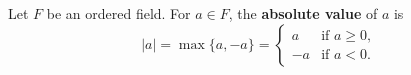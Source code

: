 Let \(F\) be an ordered field. For \(a \in F\), the \textbf{absolute value} of \(a\) is
\[
|a| = \max\{a, -a\} = \begin{cases} a & \text{if } a \geq 0, \\ -a & \text{if } a < 0. \end{cases}
\]